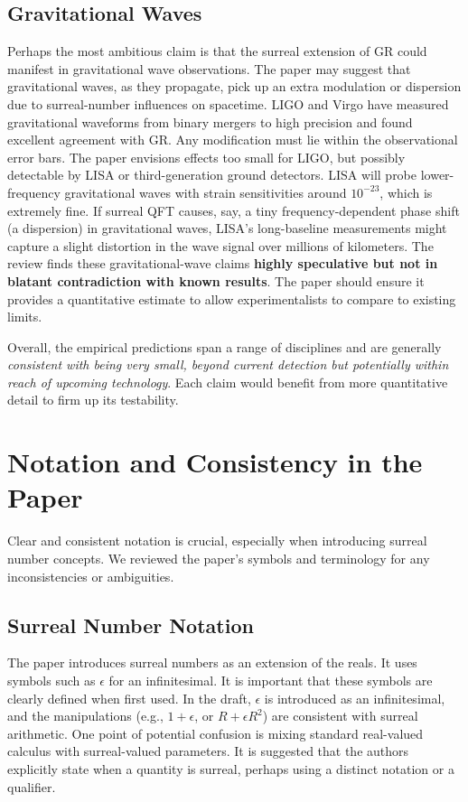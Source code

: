 \documentclass{article}
\begin{document}
\subsection*{Gravitational Waves}
Perhaps the most ambitious claim is that the surreal extension of GR could manifest in gravitational wave observations. The paper may suggest that gravitational waves, as they propagate, pick up an extra modulation or dispersion due to surreal-number influences on spacetime. LIGO and Virgo have measured gravitational waveforms from binary mergers to high precision and found excellent agreement with GR. Any modification must lie within the observational error bars. The paper envisions effects too small for LIGO, but possibly detectable by LISA or third-generation ground detectors. LISA will probe lower-frequency gravitational waves with strain sensitivities around $10^{-23}$, which is extremely fine. If surreal QFT causes, say, a tiny frequency-dependent phase shift (a dispersion) in gravitational waves, LISA’s long-baseline measurements might capture a slight distortion in the wave signal over millions of kilometers. The review finds these gravitational-wave claims \textbf{highly speculative but not in blatant contradiction with known results}. The paper should ensure it provides a quantitative estimate to allow experimentalists to compare to existing limits.

Overall, the empirical predictions span a range of disciplines and are generally \emph{consistent with being very small, beyond current detection but potentially within reach of upcoming technology}. Each claim would benefit from more quantitative detail to firm up its testability.

\section{Notation and Consistency in the Paper}

Clear and consistent notation is crucial, especially when introducing surreal number concepts. We reviewed the paper’s symbols and terminology for any inconsistencies or ambiguities.

\subsection*{Surreal Number Notation}
The paper introduces surreal numbers as an extension of the reals. It uses symbols such as $\epsilon$ for an infinitesimal. It is important that these symbols are clearly defined when first used. In the draft, $\epsilon$ is introduced as an infinitesimal, and the manipulations (e.g., $1 + \epsilon$, or $R + \epsilon R^2$) are consistent with surreal arithmetic. One point of potential confusion is mixing standard real-valued calculus with surreal-valued parameters. It is suggested that the authors explicitly state when a quantity is surreal, perhaps using a distinct notation or a qualifier.
\end{document}
